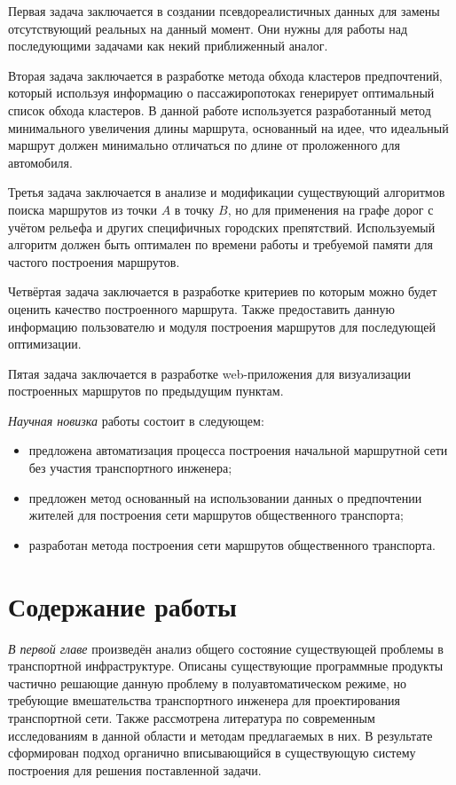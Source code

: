 Первая задача заключается в создании псевдореалистичных данных для замены отсутствующий реальных на данный 
момент. Они нужны для работы над последующими задачами как некий приближенный аналог.

Вторая задача заключается в разработке метода обхода кластеров предпочтений, который используя информацию о 
пассажиропотоках генерирует оптимальный список обхода кластеров. В данной работе используется разработанный 
метод минимального увеличения длины маршрута, основанный на идее, что идеальный маршрут должен минимально 
отличаться по длине от проложенного для автомобиля.

Третья задача заключается в анализе и модификации существующий алгоритмов поиска маршрутов из точки \( A \) 
в точку \( B \), но для применения на графе дорог с учётом рельефа и других специфичных городских 
препятствий. Используемый алгоритм должен быть оптимален по времени работы и требуемой памяти для частого 
построения маршрутов.

Четвёртая задача заключается в разработке критериев по которым можно будет оценить качество построенного 
маршрута. Также предоставить данную информацию пользователю и модуля построения маршрутов для последующей 
оптимизации.

Пятая задача заключается в разработке web-приложения для визуализации построенных маршрутов по предыдущим 
пунктам.

\emph{Научная новизка} работы состоит в следующем:
\begin{itemize}
    \item предложена автоматизация процесса построения начальной маршрутной сети без участия транспортного 
        инженера;
    \item предложен метод основанный на использовании данных о предпочтении жителей для построения сети 
        маршрутов общественного транспорта;
    \item разработан метода построения сети маршрутов общественного транспорта.
\end{itemize}

\section{Содержание работы}
\emph{В первой главе} произведён анализ общего состояние существующей проблемы в транспортной инфраструктуре. 
Описаны существующие программные продукты частично решающие данную проблему в полуавтоматическом режиме, но 
требующие вмешательства транспортного инженера для проектирования транспортной сети. Также рассмотрена 
литература по современным исследованиям в данной области и методам предлагаемых в них. В результате 
сформирован подход органично вписывающийся в существующую систему построения для решения поставленной задачи.

